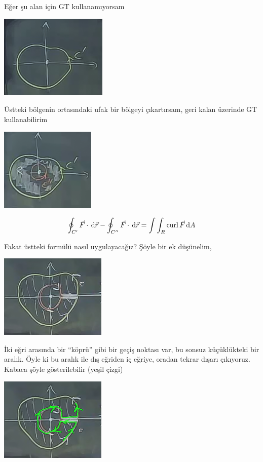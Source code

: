 \documentclass[12pt,fleqn]{article}\usepackage{../../common}
\begin{document}
Eğer şu alan için GT kullanamıyorsam

\begin{center}
\includegraphics[height=4cm]{24_3.png}
\end{center}

Üstteki bölgenin ortasındaki ufak bir bölgeyi çıkartırsam, geri kalan
üzerinde GT kullanabilirim

\begin{center}
\includegraphics[height=4cm]{24_4.png}
\end{center}

$$
\oint_{C'} \vec{F} \cdot \,\mathrm{d}\vec{r} - 
\oint_{C''} \vec{F} \cdot \,\mathrm{d}\vec{r}  =
\int \int_R \operatorname{curl} \vec{F} \,\mathrm{d} A 
$$
 
Fakat üstteki formülü nasıl uygulayacağız? Şöyle bir ek düşünelim, 

\begin{center}
\includegraphics[height=4cm]{24_5.png}
\end{center}

İki eğri arasında bir ``köprü'' gibi bir geçiş noktası var, bu sonsuz
küçüklükteki bir aralık. Öyle ki bu aralık ile dış eğriden iç eğriye,
oradan tekrar dışarı çıkıyoruz. Kabaca şöyle gösterilebilir (yeşil çizgi)

\begin{center}
\includegraphics[height=4cm]{24_6.png}
\end{center}
\end{document}
